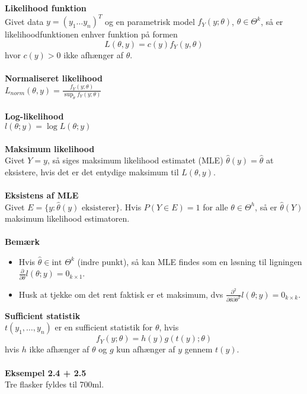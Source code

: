 \documentclass[12pt,a4paper]{report}
\author{Frederik Appel Vardinghus-Nielsen}
\begin{document}
\noindent\textbf{Likelihood funktion}\\
Givet data $y=(y_1\ldots y_n)^T$ og en parametrisk model $f_Y(y;\theta)$, $\theta\in\Theta^k$, så er likelihoodfunktionen enhver funktion på formen \begin{equation}
L(\theta,y)=c(y)f_Y(y,\theta)
\end{equation}
hvor $c(y)>0$ ikke afhænger af $\theta$.\\\\
\textbf{Normaliseret likelihood}\\
$L_{norm}(\theta,y)=\frac{f_Y(y;\theta)}{\sup_{\tilde{\theta}}f_Y(y;\theta)}$\\\\
\textbf{Log-likelihood}\\
$l(\theta;y)=\log L(\theta;y)$\\\\
\textbf{Maksimum likelihood}\\
Givet $Y=y$, så siges maksimum likelihood estimatet (MLE) $\hat{\theta}(y)=\hat{\theta}$ at eksistere, hvis det er det entydige maksimum til $L(\theta,y)$.\\\\
\textbf{Eksistens af MLE}\\
Givet $E=\{y:\hat{\theta}(y)\text{ eksisterer}\}$. Hvis $P(Y\in E)=1$ for alle $\theta\in\Theta^h$, så er $\hat{\theta}(Y)$ maksimum likelihood estimatoren.\\\\
\textbf{Bemærk}
\begin{itemize}
\item Hvis $\hat{\theta}\in \text{int }\Theta^k$ (indre punkt), så kan MLE findes som en løsning til ligningen $\frac{\partial}{\partial\theta}l(\theta;y)=0_{k\times1}$.
\item Husk at tjekke om det rent faktisk er et maksimum, dvs $\frac{\partial^2}{\partial\theta\partial\theta^T}l(\theta;y)=0_{k\times k}$.
\end{itemize}
\textbf{Sufficient statistik}\\
$t(y_1,\ldots,y_n)$ er en sufficient statistik for $\theta$, hvis
\begin{equation}
f_Y(y;\theta)=h(y)g(t(y);\theta)
\end{equation}
hvis $h$ ikke afhænger af $\theta$ og $g$ kun afhænger af $y$ gennem $t(y)$.\\\\
\textbf{Eksempel 2.4 + 2.5}\\
Tre flasker fyldes til 700ml.\\
\end{document}
